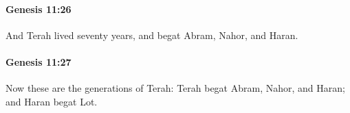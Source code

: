 		\paragraph{Genesis 11:26} %
			\label{GENESIS-11-26}

			And Terah lived seventy years, and begat Abram, Nahor, and Haran.


		\paragraph{Genesis 11:27} %
			\label{GENESIS-11-27}

			Now these are the generations of Terah: Terah begat Abram, Nahor, and Haran; and Haran begat Lot.


